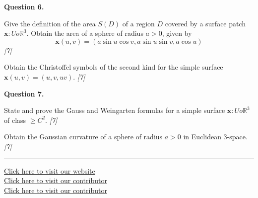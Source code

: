 \documentclass[11pt,a4paper]{article}
\newcommand{\pts}[1]{\hfill   \textit{[#1]}}
\begin{document}
\medskip


\noindent   \textbf{Question 6.}

\begin{parts}
  \item Give the definition of the area $S(D)$ of a region $D$ covered by a surface patch $\mathbf{x} : U  o \mathbb{R}^3$. Obtain the area of a sphere of radius $a > 0$, given by
  \[ \mathbf{x}(u,v) = (a \sin u \cos v, a \sin u \sin v, a \cos u) \] \pts{7}
  \item Obtain the Christoffel symbols of the second kind for the simple surface $\mathbf{x}(u, v) = (u, v, uv)$. \pts{7}
\end{parts}

\medskip


\noindent   \textbf{Question 7.}

\begin{parts}
  \item State and prove the Gauss and Weingarten formulas for a simple surface $\mathbf{x} : U  o \mathbb{R}^3$ of class $\ge C^2$. \pts{7}
  \item Obtain the Gaussian curvature of a sphere of radius $a > 0$ in Euclidean 3-space. \pts{7}
\end{parts}




\vfill
\rule{\linewidth}{0.4pt}

\begin{center}\small
\href{https://bhu-exam.vercel.app/}{Click here to visit our website}\\[4pt]\href{https://me-aryan.vercel.app/}{Click here to visit our contributor}\\[4pt]\href{https://quashan-me.vercel.app/}{Click here to visit our contributor}
\end{center}
\end{document}
